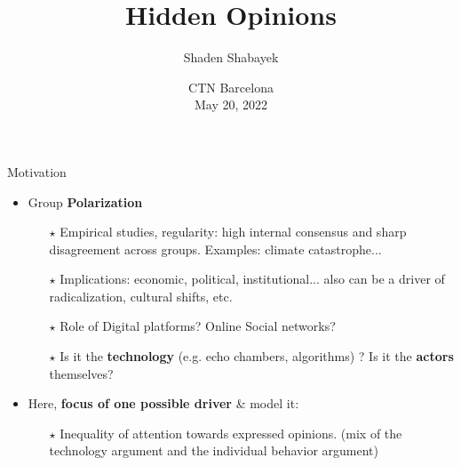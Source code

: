 \documentclass[xcolor=table]{beamer}
\title[Hidden Opinions]{Hidden Opinions}
\author{Shaden Shabayek}
\institute{ Post-doctoral Researcher \\ Sciences Po Medialab}
\date{CTN Barcelona \\ May 20, 2022 }
\makeatletter
\newenvironment{backgroundblock}[2]{%
  \global\setbox\@backgroundblock=\vbox\bgroup%
    \unvbox\@backgroundblock%
    \vbox to0pt\bgroup\vskip#2\hbox to0pt\bgroup\hskip#1\relax%
}{\egroup\egroup\egroup}
\makeatother
\begin{document}
\begin{frame}[noframenumbering]

 \titlepage
 \thispagestyle{empty}
  

\end{frame}

\begin{frame}{Motivation}


\begin{itemize} \setlength\itemsep{1em}
	\item Group {\bf\color{purple}Polarization}   \smallskip 
	
		\begin{itemize} \setlength\itemsep{1em}
			\item[$\star$] Empirical studies, regularity: high internal consensus and sharp disagreement across groups. Examples: climate catastrophe... 
			\item[$\star$] Implications: economic, political, institutional... also can be a driver of radicalization, cultural shifts, etc. 
			\item[$\star$] Role  of Digital platforms? Online Social networks? 
			\item[$\star$] Is it the {\bf\color{purple}technology} (e.g. echo chambers, algorithms) ? Is it the {\bf\color{purple}actors} themselves? 
		\end{itemize}
	\item Here, {\bf\color{purple}focus of one possible driver} \& model it: 
		\begin{itemize} \setlength\itemsep{1em}
			\item[$\star$] Inequality of attention towards expressed opinions. (mix of the technology argument and the individual behavior argument)
		\end{itemize}
\end{itemize}
\end{frame}
\end{document}
